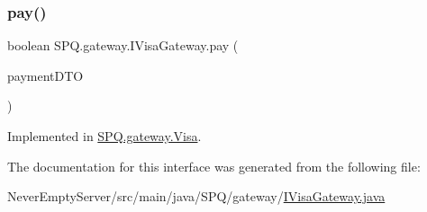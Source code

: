 \subsubsection{\texorpdfstring{pay()}{pay()}}
{\footnotesize\ttfamily boolean S\+P\+Q.\+gateway.\+I\+Visa\+Gateway.\+pay (\begin{DoxyParamCaption}\item[{\mbox{\hyperlink{class_s_p_q_1_1dto_1_1_payment_d_t_o}{Payment\+D\+TO}}}]{payment\+D\+TO }\end{DoxyParamCaption})}



Implemented in \mbox{\hyperlink{class_s_p_q_1_1gateway_1_1_visa_a0ecda0414a0685174ec12ae96c8d3a68}{S\+P\+Q.\+gateway.\+Visa}}.



The documentation for this interface was generated from the following file\+:\begin{DoxyCompactItemize}
\item 
Never\+Empty\+Server/src/main/java/\+S\+P\+Q/gateway/\mbox{\hyperlink{_i_visa_gateway_8java}{I\+Visa\+Gateway.\+java}}\end{DoxyCompactItemize}
